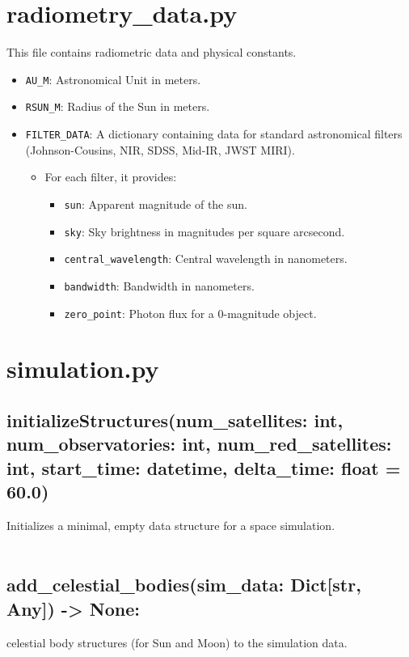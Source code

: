 \documentclass{article}
\begin{document}
\section*{radiometry\_data.py}
This file contains radiometric data and physical constants.
\begin{itemize}
\item \texttt{AU\_M}: Astronomical Unit in meters.
\item \texttt{RSUN\_M}: Radius of the Sun in meters.
\item \texttt{FILTER\_DATA}: A dictionary containing data for standard astronomical filters (Johnson-Cousins, NIR, SDSS, Mid-IR, JWST MIRI).
\begin{itemize}
\item For each filter, it provides:
\begin{itemize}
\item \texttt{sun}: Apparent magnitude of the sun.
\item \texttt{sky}: Sky brightness in magnitudes per square arcsecond.
\item \texttt{central\_wavelength}: Central wavelength in nanometers.
\item \texttt{bandwidth}: Bandwidth in nanometers.
\item \texttt{zero\_point}: Photon flux for a 0-magnitude object.
\end{itemize}
\end{itemize}
\end{itemize}

\section*{simulation.py}
\subsection*{initializeStructures(num\_satellites: int, num\_observatories: int, num\_red\_satellites: int, start\_time: datetime, delta\_time: float = 60.0)}
Initializes a minimal, empty data structure for a space simulation.\\~\\
\subsection*{add\_celestial\_bodies(sim\_data: Dict[str, Any]) -> None:}\nAdds celestial body structures (for Sun and Moon) to the simulation data.\\~\\
\end{document}
